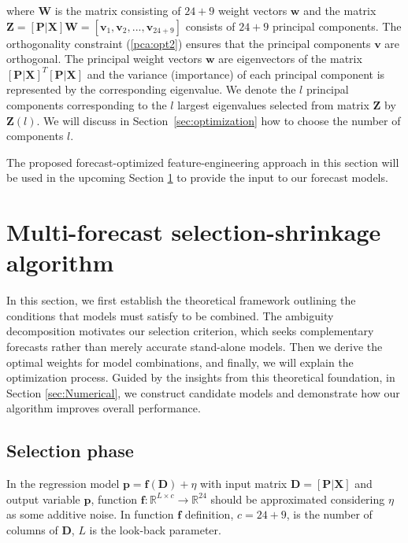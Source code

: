 \documentclass{article}
\begin{document}
where  $\boldsymbol{W}$ is the matrix consisting of $24 + 9$ weight vectors $\boldsymbol{w}$ and the matrix $\mathbf{\mathbf{Z}} = [\mathbf{P}|\mathbf{X}]\boldsymbol{W} = [\boldsymbol{v}_1,\boldsymbol{v}_2,...,\boldsymbol{v}_{24+9}]$ consists of $24 + 9$ principal components. The orthogonality constraint (\ref{pca:opt2}) ensures that the principal components  $\boldsymbol{v}$ are orthogonal. The principal weight vectors $\boldsymbol{w}$ are eigenvectors of the matrix $[\mathbf{P}|\mathbf{X}]^T[\mathbf{P}|\mathbf{X}]$ and the variance (importance) of each principal component is represented by the corresponding eigenvalue. We denote the $l$ principal components corresponding to the $l$ largest eigenvalues selected from matrix $\mathbf{Z}$ by $\mathbf{Z}(l)$. We will discuss in Section~\ref{sec:optimization} how to choose the number of components $l$.

The proposed forecast-optimized feature-engineering approach in this section will be used in the upcoming Section \ref{sec:multi-forecast} to provide the input to our forecast models. 



\section{Multi-forecast selection-shrinkage algorithm}
\label{sec:multi-forecast}
In this section, we first establish the theoretical framework outlining the conditions that models must satisfy to be combined. The ambiguity decomposition \citep{krogh1995ensembles} motivates our selection criterion, which seeks complementary forecasts rather than merely accurate stand-alone models. Then we derive the optimal weights for model combinations, and finally, we will explain the optimization process. Guided by the insights from this theoretical foundation, in Section \ref{sec:Numerical}, we construct candidate models and demonstrate how our algorithm improves overall performance. 

\subsection{Selection phase}
In the regression model $\textbf{p} = \textbf{f}(\textbf{D}) + \eta$ with input matrix $\textbf{D} = [\textbf{P}|\textbf{X}]$ and output variable $\textbf{p}$, function $\textbf{f} : \mathbb{R}^{L \times c} \to \mathbb{R}^{24}$ should be approximated considering $\eta$ as some additive noise. In function $\textbf{f}$ definition, $c = 24 +9$, is the number of columns of $\textbf{D}$, $L$ is the look-back parameter. 
\end{document}
